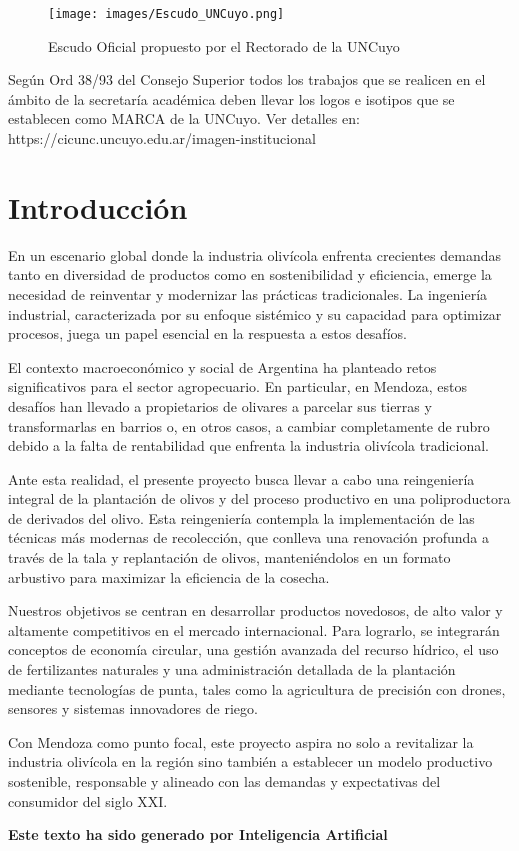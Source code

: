 \documentclass[crop=false]{standalone}
\begin{document}
\begin{figure}
\centering
\texttt{[image: images/Escudo\_UNCuyo.png]}
\label{fig:lionfigure}
\caption{Escudo Oficial propuesto por el Rectorado de la UNCuyo}
\end{figure}

Según Ord 38/93 del Consejo Superior todos los trabajos que se realicen en el ámbito de la secretaría académica deben llevar los logos e isotipos que se establecen como MARCA de la UNCuyo. 
Ver detalles en: https://cicunc.uncuyo.edu.ar/imagen-institucional

\section{Introducción}
En un escenario global donde la industria olivícola enfrenta crecientes demandas tanto en diversidad de productos como en sostenibilidad y eficiencia, emerge la necesidad de reinventar y modernizar las prácticas tradicionales. La ingeniería industrial, caracterizada por su enfoque sistémico y su capacidad para optimizar procesos, juega un papel esencial en la respuesta a estos desafíos.

El contexto macroeconómico y social de Argentina ha planteado retos significativos para el sector agropecuario. En particular, en Mendoza, estos desafíos han llevado a propietarios de olivares a parcelar sus tierras y transformarlas en barrios o, en otros casos, a cambiar completamente de rubro debido a la falta de rentabilidad que enfrenta la industria olivícola tradicional.

Ante esta realidad, el presente proyecto busca llevar a cabo una reingeniería integral de la plantación de olivos y del proceso productivo en una poliproductora de derivados del olivo. Esta reingeniería contempla la implementación de las técnicas más modernas de recolección, que conlleva una renovación profunda a través de la tala y replantación de olivos, manteniéndolos en un formato arbustivo para maximizar la eficiencia de la cosecha.

Nuestros objetivos se centran en desarrollar productos novedosos, de alto valor y altamente competitivos en el mercado internacional. Para lograrlo, se integrarán conceptos de economía circular, una gestión avanzada del recurso hídrico, el uso de fertilizantes naturales y una administración detallada de la plantación mediante tecnologías de punta, tales como la agricultura de precisión con drones, sensores y sistemas innovadores de riego.

Con Mendoza como punto focal, este proyecto aspira no solo a revitalizar la industria olivícola en la región sino también a establecer un modelo productivo sostenible, responsable y alineado con las demandas y expectativas del consumidor del siglo XXI.

\textbf{Este texto ha sido generado por Inteligencia Artificial}







\end{document}

